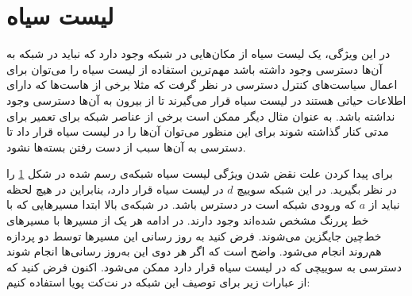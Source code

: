 \section{لیست سیاه}
در این ویژگی، یک لیست‌ سیاه
از مکان‌هایی در شبکه وجود دارد که نباید در شبکه به آن‌ها دسترسی وجود داشته باشد
\cite{network-abstractions}
مهم‌ترین استفاده از لیست سیاه را می‌توان برای اعمال سیاست‌های کنترل دسترسی در نظر گرفت که مثلا برخی از هاست‌ها که دارای اطلاعات حیاتی هستند در لیست سیاه قرار می‌گیرند تا از بیرون به آن‌ها دسترسی وجود نداشته باشد.
به عنوان مثال دیگر ممکن است برخی از عناصر شبکه برای تعمیر برای مدتی کنار گذاشته شوند برای این منظور می‌توان آن‌ها را در لیست سیاه قرار داد تا دسترسی به آن‌ها سبب از دست رفتن بسته‌ها نشود.
\begin{figure}
    \centering
    \caption{ }
    \label{fig:blacklist}
\end{figure}
برای پیدا کردن علت نقض شدن ویژگی لیست سیاه شبکه‌ی رسم شده در شکل
\ref{fig:blacklist}
را در نظر بگیرید.
در این شبکه سوییچ
$d$
در لیست‌ سیاه قرار دارد، بنابراین در هیچ لحظه نباید از
$a$
که ورودی شبکه است در دسترس باشد.
در شبکه‌ی بالا ابتدا مسیر‌هایی که با خط پررنگ مشخص شده‌اند وجود دارند.
در ادامه هر یک از مسیرها با مسیر‌های خط‌چین جایگزین می‌شوند.
فرض کنید به روز رسانی این مسیر‌ها توسط دو پردازه هم‌روند انجام می‌شود.
واضح است که اگر هر دوی این به‌روز رسانی‌ها انجام شوند دسترسی به سوییچی که در لیست سیاه قرار دارد ممکن می‌شود.
اکنون فرض کنید که از عبارات زیر برای توصیف این شبکه در نت‌کت پویا استفاده کنیم:
